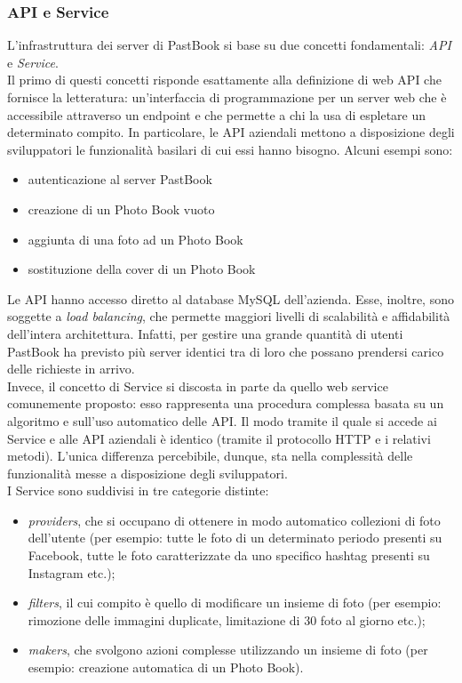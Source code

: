 			\subsubsection{API e Service}
				L'infrastruttura dei server di PastBook si base su due concetti fondamentali: \emph{API} e \emph{Service}.\\
				Il primo di questi concetti risponde esattamente alla definizione di web API che fornisce la letteratura:
				un'interfaccia di programmazione per un server web che è accessibile attraverso un endpoint e che permette a chi la
				usa di espletare un determinato compito. In particolare, le API aziendali mettono a disposizione degli sviluppatori
				le funzionalità basilari di cui essi hanno bisogno. Alcuni esempi sono:
				\begin{itemize}
					\item autenticazione al server PastBook
					\item creazione di un Photo Book vuoto
					\item aggiunta di una foto ad un Photo Book
					\item sostituzione della cover di un Photo Book
				\end{itemize}
				Le API hanno accesso diretto al database MySQL dell'azienda. Esse, inoltre, sono soggette a
				\emph{load balancing}, che permette maggiori livelli di scalabilità e
				affidabilità dell'intera architettura. Infatti, per gestire una grande quantità di utenti PastBook ha previsto più
				server identici tra di loro che possano prendersi carico delle richieste in arrivo.\\
				Invece, il concetto di Service si discosta in parte da quello web service comunemente proposto: esso rappresenta
				una procedura complessa basata su un algoritmo e sull'uso automatico delle API. Il modo tramite il quale si accede ai
				Service e alle API aziendali è identico (tramite il protocollo HTTP e i relativi metodi). L'unica differenza
				percebibile, dunque, sta nella complessità delle funzionalità messe a disposizione degli sviluppatori.\\
				I Service sono suddivisi in tre categorie distinte:
				\begin{itemize}
					\item \emph{providers}, che si occupano di ottenere in modo automatico collezioni di foto dell'utente (per
					esempio: tutte le foto di un determinato periodo presenti su Facebook, tutte le foto caratterizzate da uno
					specifico hashtag presenti su Instagram etc.);
					\item \emph{filters}, il cui compito è quello di modificare un insieme di foto (per esempio: rimozione delle
					immagini duplicate, limitazione di 30 foto al giorno etc.);
					\item \emph{makers}, che svolgono azioni complesse utilizzando un insieme di foto (per esempio: creazione
					automatica di un Photo Book).
				\end{itemize}
				
